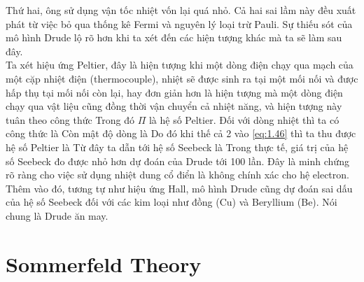 Thứ hai, ông sử dụng vận tốc nhiệt vốn lại quá nhỏ. Cả hai sai lầm này đều xuất phát từ việc bỏ qua thống kê Fermi và nguyên lý loại trừ Pauli. Sự thiếu sót của mô hình Drude lộ rõ hơn khi ta xét đến các hiện tượng khác mà ta sẽ làm sau đây.\\
\indent Ta xét hiệu ứng Peltier, đây là hiện tượng khi một dòng điện chạy qua mạch của một cặp nhiệt điện (thermocouple), nhiệt sẽ được sinh ra tại một mối nối và được hấp thụ tại mối nối còn lại, hay đơn giản hơn là hiện tượng mà một dòng điện chạy qua vật liệu cũng đồng thời vận chuyển cả nhiệt năng, và hiện tượng này tuân theo công thức
Trong đó $\Pi$ là hệ số Peltier. Đối với dòng nhiệt thì ta có công thức là
Còn mật độ dòng là
Do đó khi thế cả 2 vào \eqref{eq:1.46} thì ta thu được hệ số Peltier là
Từ đây ta dẫn tới hệ số Seebeck là
Trong thực tế, giá trị của hệ số Seebeck đo được nhỏ hơn dự đoán của Drude tới 100 lần. Đây là minh chứng rõ ràng cho việc sử dụng nhiệt dung cổ điển là không chính xác cho hệ electron. Thêm vào đó, tương tự như hiệu ứng Hall, mô hình Drude cũng dự đoán sai dấu của hệ số Seebeck đối với các kim loại như đồng (Cu) và Beryllium (Be). 
Nói chung là Drude ăn may. 
\section{Sommerfeld Theory}
